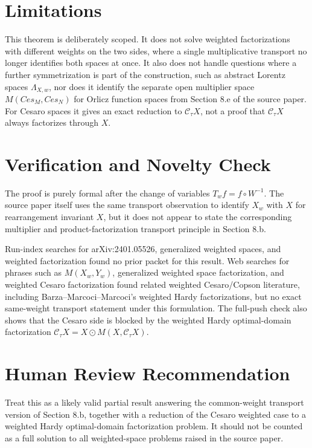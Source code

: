 \documentclass[11pt]{article}
\newcommand{\odotprod}{\odot}
\newcommand{\C}{\mathcal{C}}
\begin{document}
\section*{Limitations}

This theorem is deliberately scoped.  It does not solve weighted factorizations
with different weights on the two sides, where a single multiplicative transport
no longer identifies both spaces at once.  It also does not handle questions
where a further symmetrization is part of the construction, such as abstract
Lorentz spaces \(\Lambda_{X,w}\), nor does it identify the separate open
multiplier space \(M(Ces_M,Ces_N)\) for Orlicz function spaces from Section 8.e
of the source paper.  For Cesaro spaces it gives an exact reduction to
\(\C_\tau X\), not a proof that \(\C_\tau X\) always factorizes through \(X\).

\section*{Verification and Novelty Check}

The proof is purely formal after the change of variables \(T_w f=f\circ W^{-1}\).
The source paper itself uses the same transport observation to identify
\(X_w\) with \(X\) for rearrangement invariant \(X\), but it does not appear to
state the corresponding multiplier and product-factorization transport
principle in Section 8.b.

Run-index searches for arXiv:2401.05526, generalized weighted spaces, and
weighted factorization found no prior packet for this result.  Web searches for
phrases such as \(M(X_w,Y_w)\), generalized weighted space factorization, and
weighted Cesaro factorization found related weighted Cesaro/Copson literature,
including Barza--Marcoci--Marcoci's weighted Hardy factorizations, but no exact
same-weight transport statement under this formulation.  The full-push check
also shows that the Cesaro side is blocked by the weighted Hardy optimal-domain
factorization \(\C_\tau X=X\odotprod M(X,\C_\tau X)\).

\section*{Human Review Recommendation}

Treat this as a likely valid partial result answering the common-weight
transport version of Section 8.b, together with a reduction of the Cesaro
weighted case to a weighted Hardy optimal-domain factorization problem.  It
should not be counted as a full solution to all weighted-space problems raised
in the source paper.
\end{document}

